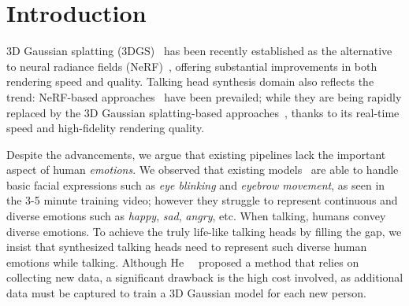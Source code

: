 \section{Introduction}
\label{sec:intro}
3D Gaussian splatting (3DGS)~\cite{kerbl20233d} has been recently established as the alternative to neural radiance fields (NeRF)~\cite{mildenhall2021nerf}, offering substantial improvements in both rendering speed and quality. Talking head synthesis domain also reflects the trend: NeRF-based approaches~\cite{peng2024synctalk,ye2023geneface,tang2022radnerf,shen2022learning,li2023efficient,guo2021ad,chatziagapi2023lipnerf} have been prevailed; while they are being rapidly replaced by the 3D Gaussian splatting-based approaches~\cite{li2024talkinggaussian,cho2024gaussiantalker,yu2024gaussiantalker,he2024emotalk3d}, thanks to its real-time speed and high-fidelity rendering quality.

Despite the advancements, we argue that existing pipelines lack the important aspect of human \emph{emotions}. We observed that existing models~\cite{li2024talkinggaussian,cho2024gaussiantalker} are able to handle basic facial expressions such as \emph{eye blinking} and \emph{eyebrow movement}, as seen in the 3-5 minute training video; however they struggle to represent continuous and diverse emotions such as \emph{happy}, \emph{sad}, \emph{angry}, etc. When talking, humans convey diverse emotions. To achieve the truly life-like talking heads by filling the gap, we insist that synthesized talking heads need to represent such diverse human emotions while talking. Although He~\etal~\cite{he2024emotalk3d} proposed a method that relies on collecting new data, a significant drawback is the high cost involved, as additional data must be captured to train a 3D Gaussian model for each new person.



